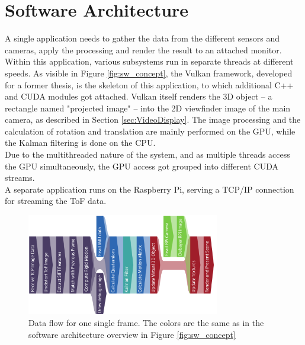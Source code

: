 \section{Software Architecture}
\label{sec:Software}
A single application needs to gather the data from the different sensors and cameras, apply the processing and render the result to an attached monitor. Within this application, various subsystems run in separate threads at different speeds. As visible in Figure \ref{fig:sw_concept}, the Vulkan framework, developed for a former thesis, is the skeleton of this application, to which additional C++ and CUDA modules got attached. Vulkan itself renders the 3D object – a rectangle named "projected image" – into the 2D viewfinder image of the main camera, as described in Section \ref{sec:VideoDisplay}. The image processing and the calculation of rotation and translation are mainly performed on the GPU, while the Kalman filtering is done on the CPU.\\
Due to the multithreaded nature of the system, and as multiple threads access the GPU simultaneously, the GPU access got grouped into different CUDA streams. \\
A separate application runs on the Raspberry Pi, serving a TCP/IP connection for streaming the ToF data. 
\begin{figure}[H]
    \centering
    \includegraphics[width=0.75\textwidth]{images/data_flow.pdf}
    \caption{Data flow for one single frame. The colors are the same as in the software architecture overview in Figure \ref{fig:sw_concept}}
    \label{im:DataFlow}
\end{figure}

